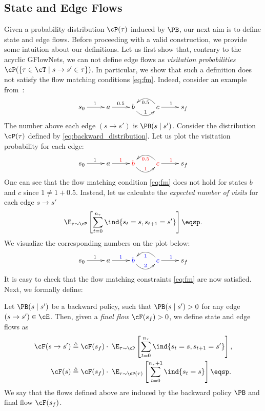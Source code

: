 \subsection{State and Edge Flows}
Given a probability distribution $\cP(\tau)$ induced by $\PB$, our next aim is to define state and edge flows. Before proceeding with a valid construction, we provide some intuition about our definitions.  Let us first show that, contrary to the acyclic GFlowNets, we can not define edge flows as \textit{visitation probabilities} $\cP(\{\tau \in \cT \mid s \to s' \in \tau\})$.
In particular, we show that such a definition does not satisfy the flow matching conditions \eqref{eq:fm}. Indeed, consider an example from~\cite{brunswic2024theory}:
\[
\xymatrix{
 s_0  \ar[r]^{1}   &a  \ar[r]^{0.5}  &b \ar@/_1pc/[r]^{1} &c  \ar@/_1pc/[l]^{0.5}\ar[r]^{1}&s_f
}
\]
The number above each edge $(s \to s')$ is $\PB(s \mid s')$. Consider the distribution $\cP(\tau)$ defined by \eqref{eq:backward_distribution}. Let us plot the {visitation probability} for each edge:
$$
\xymatrix{
 s_0  \ar[r]^{1}   &a  \ar[r]^{\textcolor{red}{1}}  &\textcolor{red}{b} \ar@/_1pc/[r]^{\textcolor{red}{1}} &\textcolor{red}{c}  \ar@/_1pc/[l]^{\textcolor{red}{0.5}}\ar[r]^{\textcolor{red}{1}}&s_f
}
$$
One can see that the flow matching condition \eqref{eq:fm} does not hold for states $b$ and $c$ since $1 \neq 1 + 0.5$. Instead, let us calculate the \textit{expected number of visits} for each edge $s \to s'$
\[
\E_{\tau \sim \cP}\left[ \sum_{t = 0}^{n_\tau} \ind\{s_{t} = s, s_{t + 1} = s'\}\right]\eqsp.
\]
We visualize the corresponding numbers on the plot below:
$$
\xymatrix{
 s_0  \ar[r]^{1}   &a  \ar[r]^{\textcolor{blue}{1}}  &\textcolor{blue}{b} \ar@/_1pc/[r]^{\textcolor{blue}{2}} &\textcolor{blue}{c}  \ar@/_1pc/[l]^{\textcolor{blue}{1}}\ar[r]^{\textcolor{blue}{1}}&s_f
}
$$
It is easy to check that the flow matching constraints \eqref{eq:fm} are now satisfied. Next, we formally define:
\begin{definition}
\label{def:cyclic_flows}
Let $\PB(s \mid s')$ be a backward policy, such that $\PB(s \mid s') > 0$ for any edge $(s \to s') \in \cE$. Then, given a \emph{final flow} $\cF(s_f) > 0$, we define state and edge flows as
\begin{align} 
\cF(s \to s') &\triangleq \cF(s_f) \cdot \;\E_{\tau \sim \cP}\left[ \sum_{t = 0}^{n_\tau} \ind\{s_{t} = s, s_{t + 1} = s'\}\right], \nonumber  \\
\cF(s) & \triangleq \cF(s_f) \cdot \;\E_{\tau \sim \cP(\tau)}\left[ \sum_{t = 0}^{n_{\tau}+1} \ind\{s_t = s\}\right] \label{eq:flow_eqs}\eqsp.
\end{align}
We say that the flows defined above are induced by the backward policy $\PB$ and final flow $\cF(s_f)$.
\end{definition}
